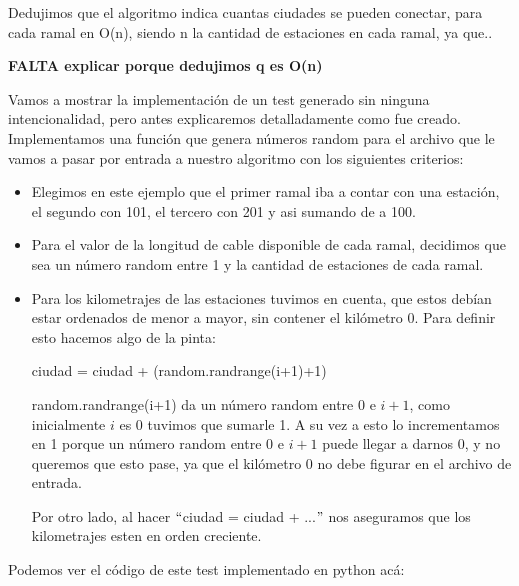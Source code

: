 Dedujimos que el algoritmo indica cuantas ciudades se pueden conectar, para cada ramal en O(n), siendo n la cantidad de estaciones en cada ramal, ya que..

\textbf{FALTA explicar porque dedujimos q es O(n)}


Vamos a mostrar la implementación de un test generado sin ninguna intencionalidad, pero antes explicaremos detalladamente como fue creado. \\

Implementamos una función que genera números random para el archivo que le vamos a pasar por entrada a nuestro algoritmo con los siguientes criterios:
\begin{itemize}
\item Elegimos en este ejemplo que el primer ramal iba a contar con una estación, el segundo con 101, el tercero con 201 y asi sumando de a 100.
\item Para el valor de la longitud de cable disponible de cada ramal, decidimos que sea un número random entre 1 y la cantidad de estaciones de cada ramal.
\item Para los kilometrajes de las estaciones tuvimos en cuenta, que estos debían estar ordenados de menor a mayor, sin contener el kilómetro 0. Para definir esto hacemos algo de la pinta:

ciudad = ciudad + (random.randrange(i+1)+1)

random.randrange(i+1) da un número random entre 0 e $i+1$, como inicialmente $i$ es 0 tuvimos que sumarle 1. A su vez a esto lo incrementamos en 1 porque un número random entre 0 e $i+1$ puede llegar a darnos 0, y no queremos que esto pase, ya que el kilómetro 0 no debe figurar en el archivo de entrada.

Por otro lado, al hacer $``$ciudad = ciudad + ...$"$ nos aseguramos que los kilometrajes esten en orden creciente.

\end{itemize}

Podemos ver el código de este test implementado en python acá:

